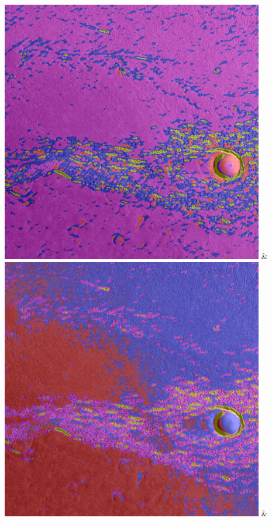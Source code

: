\begin{table}[h!]
\begin{tabularx}{\textwidth}
		\includegraphics[width=0.9\linewidth]{images/gen/color_weight/p03_02.png_0.66.png} &
		\includegraphics[width=0.9\linewidth]{images/gen/color_weight/p03_02.png_1.00.png} &

\end{tabularx}
\end{table}
